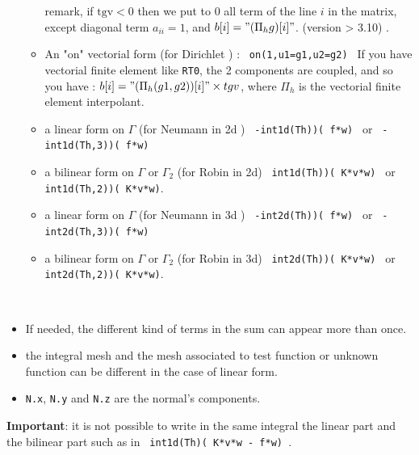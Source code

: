 \documentclass[a4paper,twoside,12pt]{book}
\begin{document}
\begin{itemize}
\begin{itemize}
             remark, if $\mathrm{tgv} < 0$ then we put to $0$  all term of the line $i$ in the matrix,
             except diagonal term $a_{ii}=1$, and $b[i] = "(\Pi_h g)[i]"$.  (version > 3.10) .
         \item  An "on" vectorial  form (for Dirichlet ) :
             \texttt{ on(1,u1=g1,u2=g2) }
                If you have vectorial finite element like \texttt{RT0}, the 2 components are coupled, and so
                 you have : $b[i] = "(\Pi_h (g1,g2))[i]" \times tgv $, where $\Pi_h $ is the vectorial finite element interpolant.
       \item  a linear form on $\Gamma$  (for Neumann in 2d ) 
         \texttt{ -int1d(Th))( f*w) } or \texttt{ -int1d(Th,3))( f*w) }
        \item   a bilinear form on $\Gamma$  or $\Gamma_{2}$ (for  Robin in 2d)
         \texttt{ int1d(Th))( K*v*w) } or
         \texttt{ int1d(Th,2))( K*v*w)}.
       \item  a linear form on $\Gamma$  (for Neumann in 3d ) 
         \texttt{ -int2d(Th))( f*w) } or \texttt{ -int2d(Th,3))( f*w) }
        \item   a bilinear form on $\Gamma$  or $\Gamma_{2}$ (for  Robin in 3d)
         \texttt{ int2d(Th))( K*v*w) } or
         \texttt{ int2d(Th,2))( K*v*w)}.

    \end{itemize}

\end{itemize}

\begin{note} ~

\begin{itemize}
\item
If needed, the different kind of terms in the sum can appear more than once.

\item the integral mesh and the mesh associated to test function or unknown
function can be different in the case of linear form.


\item  \texttt{N.x}, \texttt{N.y} and  \texttt{N.z} are the normal's components. 
\end{itemize}
 \end{note}

{\bf Important}: it is not possible to write in the same integral the
linear part and the bilinear part such as in
\texttt{ int1d(Th)( K*v*w - f*w) }.
\end{document}
